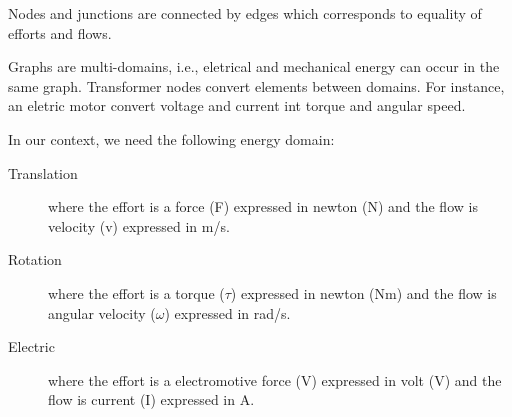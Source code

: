 Nodes and junctions are connected by edges which corresponds to equality of efforts and flows.

Graphs are multi-domains, i.e., eletrical and mechanical energy can occur in the same graph.
Transformer nodes convert elements between domains.
For instance, an eletric motor convert voltage and current int torque and angular speed.
    
In our context, we need the following energy domain:
\begin{description}
\item[Translation] where the effort is a force (F) expressed in newton (N) and the flow is velocity (v) expressed in m/s.
\item[Rotation] where the effort is a torque ($\tau$) expressed in newton (Nm) and the flow is angular velocity ($\omega$) expressed in rad/s.
\item[Electric] where the effort is a electromotive force (V) expressed in volt (V) and the flow is current (I) expressed in A.
\end{description}


